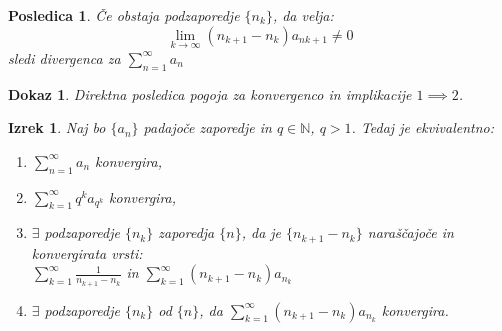 \documentclass{beamer}
\newtheorem{izrek}{Izrek}
\newtheorem{posledica}{Posledica}
\newtheorem{dokaz}{Dokaz}
\begin{document}
\begin{frame}
    \begin{posledica}
        Če obstaja podzaporedje $\{n_k\}$, da velja:
        \[
            \lim_{k \to \infty} (n_{k+1} - n_k)a_{n{k+1}} \neq 0 
        \] 
        sledi divergenca za $\sum_{n = 1}^{\infty}{a_n}$
    \end{posledica}

    \vspace{0.45cm}
    \pause
    \begin{dokaz}
        Direktna posledica pogoja za konvergenco in implikacije $1 \implies 2$.
    \end{dokaz}   
\end{frame}

\begin{frame}
    \begin{izrek}
        Naj bo $\{a_n\}$ padajoče zaporedje in $ q \in {\mathbb{N}}$, $q > 1$. Tedaj je ekvivalentno:
        \begin{enumerate}
            \item $\sum_{n = 1}^{\infty}{a_n}$ konvergira,
            \item $\sum_{k = 1}^{\infty}{q^ka_{q^k}}$ konvergira,
            \item $\exists$ podzaporedje $\{n_k\}$ zaporedja $\{n\}$, da je $\{n_{k+1} - n_k\}$ 
            naraščajoče in konvergirata vrsti:\\
            $\sum_{k = 1}^{\infty}{\frac{1}{n_{k+1} - n_k}}$ in 
            $\sum_{k = 1}^{\infty}{(n_{k+1} - n_k)a_{n_k}}$  
            \item $\exists$ podzaporedje $\{n_k\}$ od $\{n\}$, da $\sum_{k = 1}^{\infty}{(n_{k+1} - n_k)a_{n_k}}$ konvergira.
        \end{enumerate}
    \end{izrek}    
\end{frame}
\end{document}
